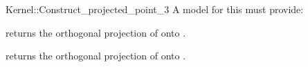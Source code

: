 \begin{ccRefFunctionObjectConcept}{Kernel::Construct_projected_point_3}
A model for this must provide:


       {returns the orthogonal projection of  onto .}

       {returns the orthogonal projection of  onto .}

\ccIsModel{}

\end{ccRefFunctionObjectConcept}
